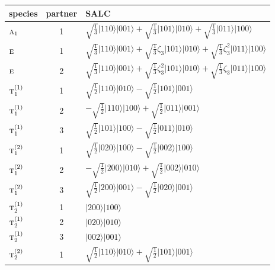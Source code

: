 \documentclass[11pt]{article}
\newcommand{\irr}[1]{\text{\normalfont\scshape #1}}
\newcommand{\rootunity}[1]{\zeta_{#1}}
\newcommand{\occ}[1]{\lvert #1\rangle}
\begin{document}
\begin{longtable}{l c p{}}\hline species & partner & SALC\\ \hline\endhead

$\irr{a}_{1}$ & 1 & $\sqrt{\tfrac{1}{3}}\occ{110}\occ{001}+\sqrt{\tfrac{1}{3}}\occ{101}\occ{010}+\sqrt{\tfrac{1}{3}}\occ{011}\occ{100}$\\

$\irr{e}$ & 1 & $\sqrt{\tfrac{1}{3}}\occ{110}\occ{001}+\sqrt{\tfrac{1}{3}}\rootunity{3}\occ{101}\occ{010}+\sqrt{\tfrac{1}{3}}\rootunity{3}^{2}\occ{011}\occ{100}$\\

$\irr{e}$ & 2 & $\sqrt{\tfrac{1}{3}}\occ{110}\occ{001}+\sqrt{\tfrac{1}{3}}\rootunity{3}^{2}\occ{101}\occ{010}+\sqrt{\tfrac{1}{3}}\rootunity{3}\occ{011}\occ{100}$\\

$\irr{t}_{1}^{(1)}$ & 1 & $\sqrt{\tfrac{1}{2}}\occ{110}\occ{010}-\sqrt{\tfrac{1}{2}}\occ{101}\occ{001}$\\

$\irr{t}_{1}^{(1)}$ & 2 & $-\sqrt{\tfrac{1}{2}}\occ{110}\occ{100}+\sqrt{\tfrac{1}{2}}\occ{011}\occ{001}$\\

$\irr{t}_{1}^{(1)}$ & 3 & $\sqrt{\tfrac{1}{2}}\occ{101}\occ{100}-\sqrt{\tfrac{1}{2}}\occ{011}\occ{010}$\\

$\irr{t}_{1}^{(2)}$ & 1 & $\sqrt{\tfrac{1}{2}}\occ{020}\occ{100}-\sqrt{\tfrac{1}{2}}\occ{002}\occ{100}$\\

$\irr{t}_{1}^{(2)}$ & 2 & $-\sqrt{\tfrac{1}{2}}\occ{200}\occ{010}+\sqrt{\tfrac{1}{2}}\occ{002}\occ{010}$\\

$\irr{t}_{1}^{(2)}$ & 3 & $\sqrt{\tfrac{1}{2}}\occ{200}\occ{001}-\sqrt{\tfrac{1}{2}}\occ{020}\occ{001}$\\

$\irr{t}_{2}^{(1)}$ & 1 & $\occ{200}\occ{100}$\\

$\irr{t}_{2}^{(1)}$ & 2 & $\occ{020}\occ{010}$\\

$\irr{t}_{2}^{(1)}$ & 3 & $\occ{002}\occ{001}$\\

$\irr{t}_{2}^{(2)}$ & 1 & $\sqrt{\tfrac{1}{2}}\occ{110}\occ{010}+\sqrt{\tfrac{1}{2}}\occ{101}\occ{001}$\\


\end{longtable}
\end{document}
